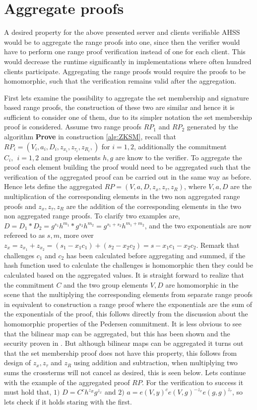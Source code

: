 \section{Aggregate proofs}
A desired property for the above presented server and clients verifiable AHSS would be to aggregate the range proofs into one, since then the verifier would have to perform one range proof verification instead of one for each client. This would decrease the runtime significantly in implementations where often hundred clients participate. Aggregating the range proofs would require the proofs to be homomorphic, such that the verification remains valid after the aggregation. 

First lets examine the possibility to aggregate the set membership and signature based range proofs, the construction of these two are similar and hence it is sufficient to consider one of them, due to  its simpler notation the set membership proof is considered. Assume two range proofs $RP_1$ and $RP_2$ generated by the algorithm \textbf{Prove} in construction \ref{alg:ZKSM}, recall that $RP_i = (V_i,a_i,D_i,z_{x_i},z_{\tau _i},z_{R_i}, )$ for $i=1,2$,  additionally the commitment $C_i, \:\: i=1,2$ and group elements $h,g$ are know to the verifier. To aggregate the proof each element building the proof would need to be aggregated such that the verification of the aggregated proof can be carried out in the same way as before. 
Hence lets define the aggregated  $RP = (V,a,D,z_{x},z_{\tau },z_{R})$, where $V, a, D$ are the multiplication of the corresponding elements in the two non aggregated range proofs and $z_{x},z_{\tau },z_{R}$ are the addition of the corresponding elements in the two non aggregated range proofs. To clarify two examples are, $D=D_1*D_2 =g^{s_1}h^{m_1}*g^{s_2}h^{m_2} = g^{s_1+s_2}h^{m_1+m_2}$, and the two exponentials are now refereed to as $s,m$, more over $z_x = z_{x_1}+z_{x_2} = (s_1-x_1c_1 )+ (s_2-x_2c_2) = s- x_1c_1-x_2c_2 $. Remark that challenges $c_1$ and $c_2$ has been calculated before aggregating and summed, if the hash function used to calculate the challenges is homomorphic then they could be calculated based on the aggregated values. It is straight forward to realize that the commitment $C$ and the two group elements $V,D$ are homomorphic in the scene that the multiplying the corresponding elements from separate range proofs in equivalent to construction a range proof where the exponentials are the sum of the exponentials of the proof, this follows directly from the discussion about the homomorphic properties of the Pedersen commitment. It is less obvious to see that the bilinear map can be aggregated, but this has been shown and the security proven in \cite{aggregate_bm}. But although bilinear maps can be aggregated it turns out that the set membership proof does not have this property, this follows from design of $z_x,z_\tau $ and $z_R$ using addition and subtraction, when multiplying two sums the crossterms will not cancel as desired, this is seen below. Lets continue with the example of the aggregated proof $RP$. For the verification to success it must hold that, $1)$ $D= C^ch^{z_R}g^{z_x}$ and $2)$ $ a = e(V,y)^ce(V,g)^{-z_x}e(g,g)^{z_\tau}$, so lets check if it holds staring with the first.


